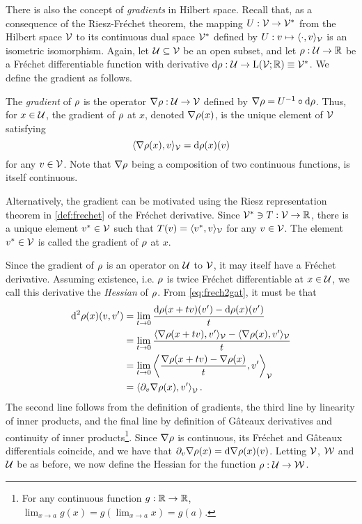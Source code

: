 There is also the concept of \emph{gradients} in Hilbert space.
Recall that, as a consequence of the Riesz-Fréchet theorem, the mapping $U:{\mathcal V}\to{\mathcal V}^*$ from the Hilbert space ${\mathcal V}$ to its continuous dual space ${\mathcal V}^*$ defined by $U:v\mapsto\langle\cdot,v\rangle_{\mathcal V}$ is an isometric isomorphism.
Again, let ${\mathcal U} \subseteq {\mathcal V}$ be an open subset, and let $\rho :{\mathcal U}\to\mathbb{R}$ be a Fréchet differentiable function with derivative $\text{d} \rho : {\mathcal U} \to \text{L}({\mathcal V};\mathbb{R}) \equiv {\mathcal V}^*$.
We define the gradient as follows.

\begin{definition}
  The \emph{gradient} of $\rho$ is the operator $\nabla \rho : {\mathcal U} \to {\mathcal V}$ defined by $\nabla \rho = U^{-1} \circ \text{d} \rho$.
  Thus, for $x \in {\mathcal U}$, the gradient of $\rho$ at $x$, denoted $\nabla \rho(x)$, is the unique element of ${\mathcal V}$ satisfying
  \[
    \langle\nabla \rho(x), v\rangle_{\mathcal V} = \text{d} \rho(x)(v)
  \]
  for any $v \in {\mathcal V}$.
  Note that $\nabla \rho$ being a composition of two continuous functions, is itself continuous.
\end{definition}

\begin{remark}
  Alternatively, the gradient can be motivated using the Riesz representation theorem in \cref{def:frechet} of the Fréchet derivative.
  Since ${\mathcal V}^*\ni T:{\mathcal V}\to\mathbb{R}$, there is a unique element $v^*\in{\mathcal V}$ such that $T(v)=\langle v^*,v\rangle_{\mathcal V}$ for any $v\in{\mathcal V}$.
  The element $v^*\in{\mathcal V}$ is called the gradient of $\rho$ at $x$.
\end{remark}

Since the gradient of $\rho$ is an operator on ${\mathcal U}$ to ${\mathcal V}$, it may itself have a Fréchet derivative.
Assuming existence, i.e. $\rho$ is twice Fréchet differentiable at $x \in {\mathcal U}$, we call this derivative the \emph{Hessian} of $\rho$.
From \cref{eq:frech2gat}, it must be that
\begin{align*}
  \d^2 \funder(x)(v,v') &= \lim_{t\to 0} \frac{\d \funder(x + t v)(v') - \d \funder(x)(v')}{t} \\
  &= \lim_{t\to 0} \frac{\ip{\nabla \funder(x+tv), v'}_\cV - \ip{\nabla \funder(x), v'}_\cV}{t} \\
  &= \lim_{t\to 0} \left\langle \frac{\nabla \funder(x+tv) - \nabla \funder(x)}{t} , v' \right\rangle_\cV \\%
  &= \left\langle \partial_v \nabla \funder(x) , v' \right\rangle_\cV.
\end{align*}
The second line follows from the definition of gradients, the third line by linearity of inner products, and the final line by definition of Gâteaux derivatives and continuity of inner products\footnote{For any continuous function $g:\mathbb{R}\to\mathbb{R}$, $\lim_{x\to a} g(x) = g(\lim_{x\to a} x) = g(a)$.}.
Since $\nabla \rho$ is continuous, its Fréchet and Gâteaux differentials coincide, and we have that $\partial_v \nabla \rho(x) = \text{d} \nabla \rho(x) (v)$.
Letting ${\mathcal V}$, ${\mathcal W}$ and ${\mathcal U}$ be as before, we now define the Hessian for the function $\rho :{\mathcal U} \to {\mathcal W}$.

